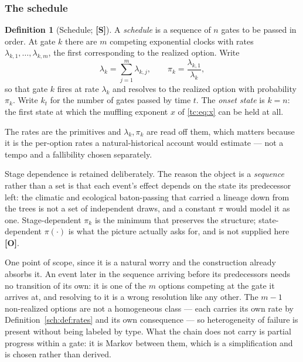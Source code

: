 \documentclass[11pt]{article}
\numberwithin{equation}{section}
\theoremstyle{plain}
\theoremstyle{definition}
\newtheorem{definition}[theorem]{Definition}
\theoremstyle{remark}
\begin{document}
\subsubsection{The schedule}\label{sch:subsub:model}

\begin{definition}[Schedule; \textbf{[S]}]\label{sch:def:schedule}
A \emph{schedule} is a sequence of $n$ gates to be passed in order. At
gate $k$ there are $m$ competing exponential clocks with rates
$\lambda_{k,1},\dots,\lambda_{k,m}$, the first corresponding to the
realized option. Write
\begin{equation}\label{sch:eq:clocks}
\lambda_k=\sum_{j=1}^{m}\lambda_{k,j},
\qquad
\pi_k=\frac{\lambda_{k,1}}{\lambda_k},
\end{equation}
so that gate $k$ fires at rate $\lambda_k$ and resolves to the realized
option with probability $\pi_k$. Write $k_t$ for the number of gates
passed by time $t$. The \emph{onset state} is $k=n$: the first state at
which the muffling exponent $x$ of \eqref{tc:eq:x} can be held at all.
\end{definition}

The rates are the primitives and $\lambda_k,\pi_k$ are read off them,
which matters because it is the per-option rates a natural-historical
account would estimate --- not a tempo and a fallibility chosen
separately.

Stage dependence is retained deliberately. The reason the object is a
\emph{sequence} rather than a set is that each event's effect depends on
the state its predecessor left: the climatic and ecological
baton-passing that carried a lineage down from the trees is not a set of
independent draws, and a constant $\pi$ would model it as one.
Stage-dependent $\pi_k$ is the minimum that preserves the structure;
state-dependent $\pi(\cdot)$ is what the picture actually asks for, and
is not supplied here \textbf{[O]}.

One point of scope, since it is a natural worry and the construction
already absorbs it. An event later in the sequence arriving before its
predecessors needs no transition of its own: it is one of the $m$
options competing at the gate it arrives at, and resolving to it is a
wrong resolution like any other. The $m-1$ non-realized options are not
a homogeneous class --- each carries its own rate by
Definition~\ref{sch:def:rates} and its own consequence --- so
heterogeneity of failure is present without being labeled by type. What
the chain does not carry is partial progress within a gate: it is Markov
between them, which is a simplification and is chosen rather than
derived.
\end{document}
